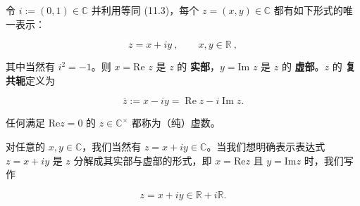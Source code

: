 令 $ i := (0,1) \in \mathbb{C} $ 并利用等同 (11.3)，每个 $ z = (x,y) \in \mathbb{C} $ 都有如下形式的唯一表示：

\begin{equation}
z=x+i y~,\qquad x,y\in\mathbb{R}~,
\end{equation}

其中当然有 $ i^2 = -1 $。则 $ x = \text{Re } z $ 是 $ z $ 的 \textbf{实部}，$ y = \text{Im } z $ 是 $ z $ 的 \textbf{虚部}。$ z $ 的 \textbf{复共轭}定义为

\[
\overline{{z}}:=x-i y=\operatorname{R e}z-i\operatorname{I m}z.
\]

任何满足 $ \mathrm{Re} z = 0 $ 的 $ z \in \mathbb{C}^\times $ 都称为（纯）虚数。

对任意的 $ x, y \in \mathbb{C} $，我们当然有 $ z = x + iy \in \mathbb{C} $。当我们想明确表示表达式 $ z = x + iy $ 是 $ z $ 分解成其实部与虚部的形式，即 $ x = \text{Re}z $ 且 $ y = \text{Im}z $ 时，我们写作

\[
z=x+i y\in\mathbb{R}+i\mathbb{R}.
\]

